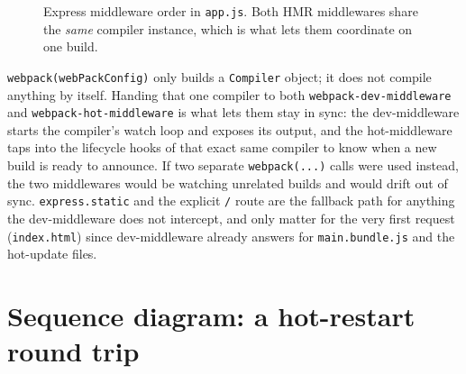 \documentclass{article}
\begin{document}
\begin{figure}[h]
\centering
{}
\caption{Express middleware order in \texttt{app.js}. Both HMR middlewares share the \emph{same} compiler instance, which is what lets them coordinate on one build.}
\end{figure}

\texttt{webpack(webPackConfig)} only builds a \texttt{Compiler} object; it
does not compile anything by itself. Handing that one compiler to both
\texttt{webpack-dev-middleware} and \texttt{webpack-hot-middleware} is what
lets them stay in sync: the dev-middleware starts the compiler's watch loop
and exposes its output, and the hot-middleware taps into the lifecycle hooks
of that exact same compiler to know when a new build is ready to announce.
If two separate \texttt{webpack(...)} calls were used instead, the two
middlewares would be watching unrelated builds and would drift out of sync.
\texttt{express.static} and the explicit \texttt{/} route are the fallback
path for anything the dev-middleware does not intercept, and only matter
for the very first request (\texttt{index.html}) since dev-middleware
already answers for \texttt{main.bundle.js} and the hot-update files.

\section{Sequence diagram: a hot-restart round trip}
\end{document}
